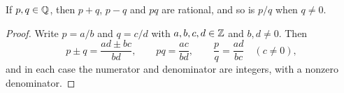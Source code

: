 \begin{theorem}\label{thm:rational-closure}
  If $p, q \in \mathbb{Q}$, then $p + q$, $p - q$ and $pq$ are rational, and so is
  $p / q$ when $q \neq 0$.
\end{theorem}

\begin{proof}
  Write $p = a/b$ and $q = c/d$ with $a, b, c, d \in \mathbb{Z}$ and $b, d \neq 0$.
  Then
  \[
    p \pm q = \frac{ad \pm bc}{bd}, \qquad
    pq = \frac{ac}{bd}, \qquad
    \frac pq = \frac{ad}{bc} \quad (c \neq 0),
  \]
  and in each case the numerator and denominator are integers, with a nonzero
  denominator.
\end{proof}
